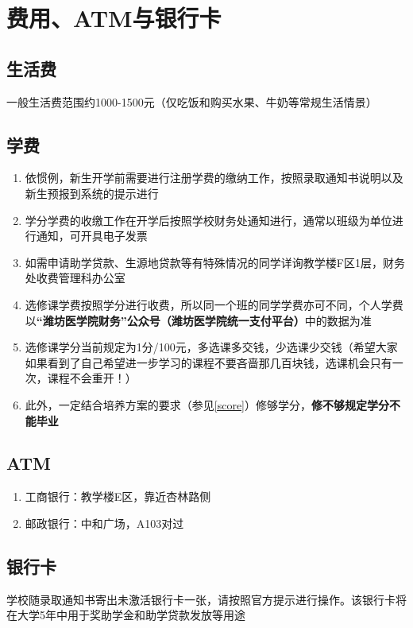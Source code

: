 \chapter[费用、ATM与银行卡]{费用、ATM与银行卡}

\section[生活费]{生活费}
一般生活费范围约1000-1500元（仅吃饭和购买水果、牛奶等常规生活情景）

\section[学费]{学费\footnotemark}
\begin{enumerate}
    \item 依惯例，新生开学前需要进行注册学费的缴纳工作，按照录取通知书说明以及新生预报到系统\footnotemark 的提示进行
    \item 学分学费的收缴工作在开学后按照学校财务处通知进行，通常以班级为单位进行通知，可开具电子发票
    \item 如需申请助学贷款、生源地贷款等有特殊情况的同学详询教学楼F区1层，财务处收费管理科办公室
    \item 选修课学费按照学分进行收费，所以同一个班的同学学费亦可不同，个人学费以\textbf{“潍坊医学院财务”公众号（潍坊医学院统一支付平台）}中的数据为准
    \item 选修课学分当前规定为1分/100元，多选课多交钱，少选课少交钱（希望大家如果看到了自己希望进一步学习的课程不要吝啬那几百块钱，选课机会只有一次，课程不会重开！）
    \item 此外，一定结合培养方案的要求（参见\uline{\ref{score}}）修够学分，\textbf{修不够规定学分不能毕业}
\end{enumerate}

\section[ATM]{ATM\footnotemark}
\begin{enumerate}
    \item 工商银行：教学楼E区，靠近杏林路侧
    \item 邮政银行：中和广场，A103对过
\end{enumerate}

\section[银行卡]{银行卡}
学校随录取通知书寄出未激活银行卡一张，请按照官方提示进行操作。该银行卡将在大学5年中用于奖助学金和助学贷款发放等用途
